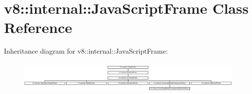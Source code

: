 \hypertarget{classv8_1_1internal_1_1JavaScriptFrame}{}\section{v8\+:\+:internal\+:\+:Java\+Script\+Frame Class Reference}
\label{classv8_1_1internal_1_1JavaScriptFrame}
Inheritance diagram for v8\+:\+:internal\+:\+:Java\+Script\+Frame\+:\begin{figure}[H]
\begin{center}
\leavevmode
\includegraphics[height=1.618497cm]{classv8_1_1internal_1_1JavaScriptFrame}
\end{center}
\end{figure}
